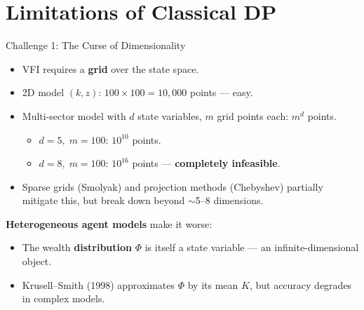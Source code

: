 \documentclass[10pt,english,aspectratio=169]{beamer}
\begin{document}
\section{Limitations of Classical DP}

\begin{frame}{Challenge 1: The Curse of Dimensionality}
\begin{itemize}
    \item VFI requires a \textbf{grid} over the state space.
    \item 2D model $(k, z)$: $100 \times 100 = 10{,}000$ points --- easy.
    \item Multi-sector model with $d$ state variables, $m$ grid points each: $m^d$ points.
    \begin{itemize}
        \item $d = 5,\; m = 100$: $10^{10}$ points.
        \item $d = 8,\; m = 100$: $10^{16}$ points --- \textbf{completely infeasible}.
    \end{itemize}
    \item Sparse grids (Smolyak) and projection methods (Chebyshev) partially mitigate this, but break down beyond $\sim$5--8 dimensions.
\end{itemize}

\vspace{0.3cm}
\textbf{Heterogeneous agent models} make it worse:
\begin{itemize}
    \item The wealth \textbf{distribution} $\Phi$ is itself a state variable --- an infinite-dimensional object.
    \item Krusell--Smith (1998) approximates $\Phi$ by its mean $K$, but accuracy degrades in complex models.
\end{itemize}
\end{frame}
\end{document}
